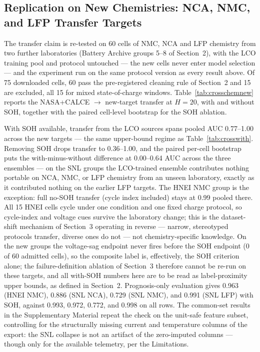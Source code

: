 \documentclass[11pt,a4paper]{article}
\begin{document}
\subsection{Replication on New Chemistries: NCA, NMC, and LFP Transfer Targets}
The transfer claim is re-tested on 60 cells of NMC, NCA and LFP chemistry from two further laboratories (Battery Archive groups 5--8 of Section~2), with the LCO training pool and protocol untouched --- the new cells never enter model selection --- and the experiment run on the same protocol version as every result above. Of 75 downloaded cells, 60 pass the pre-registered cleaning rule of Section~2 and 15 are excluded, all 15 for mixed state-of-charge windows. Table~\ref{tab:crosschemnew} reports the NASA+CALCE $\rightarrow$ new-target transfer at $H{=}20$, with and without SOH, together with the paired cell-level bootstrap for the SOH ablation.

With SOH available, transfer from the LCO sources spans pooled AUC 0.77--1.00 across the new targets --- the same upper-bound regime as Table~\ref{tab:crosswith}. Removing SOH drops transfer to 0.36--1.00, and the paired per-cell bootstrap puts the with-minus-without difference at 0.00--0.64 AUC across the three ensembles --- on the SNL groups the LCO-trained ensemble contributes nothing portable on NCA, NMC, or LFP chemistry from an unseen laboratory, exactly as it contributed nothing on the earlier LFP targets. The HNEI NMC group is the exception: full no-SOH transfer (cycle index included) stays at 0.99 pooled there. All 15 HNEI cells cycle under one condition and one fixed charge protocol, so cycle-index and voltage cues survive the laboratory change; this is the dataset-shift mechanism of Section~3 operating in reverse --- narrow, stereotyped protocols transfer, diverse ones do not --- not chemistry-specific knowledge. On the new groups the voltage-sag endpoint never fires before the SOH endpoint (0 of 60 admitted cells), so the composite label is, effectively, the SOH criterion alone; the failure-definition ablation of Section~3 therefore cannot be re-run on these targets, and all with-SOH numbers here are to be read as label-proximity upper bounds, as defined in Section~2. Prognosis-only evaluation gives 0.963 (HNEI NMC), 0.886 (SNL NCA), 0.729 (SNL NMC), and 0.991 (SNL LFP) with SOH, against 0.993, 0.972, 0.772, and 0.998 on all rows. The common-set results in the Supplementary Material repeat the check on the unit-safe feature subset, controlling for the structurally missing current and temperature columns of the export: the SNL collapse is not an artifact of the zero-imputed columns --- though only for the available telemetry, per the Limitations.
\end{document}
